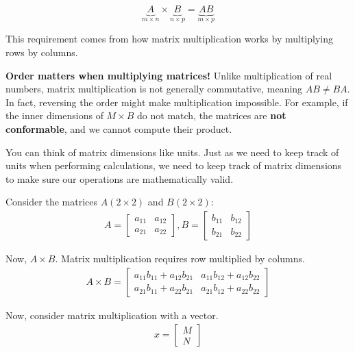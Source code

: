 \documentclass[12pt]{article}
\begin{document}
\[
\underbrace{A}_{m \times n} \times
\underbrace{B}_{n \times p}
=
\underbrace{AB}_{m \times p}
\]

This requirement comes from how matrix multiplication works by multiplying rows by columns. 

\textbf{Order matters when multiplying matrices!} Unlike multiplication of real numbers, matrix multiplication is not generally commutative, meaning $AB \neq BA$. In fact, reversing the order might make multiplication impossible. For example, if the inner dimensions of $M \times B$ do not match, the matrices are \textbf{not conformable}, and we cannot compute their product.

You can think of matrix dimensions like units. Just as we need to keep track of units when performing calculations, we need to keep track of matrix dimensions to make sure our operations are mathematically valid.

Consider the matrices $A (2 \times 2)$  and $B (2 \times 2)$:
\begin{align}
    A = \begin{bmatrix}
            a_{11} & a_{12} \\
            a_{21} & a_{22}
        \end{bmatrix}, 
    B = \begin{bmatrix}
            b_{11} & b_{12} \\
            b_{21} & b_{22}
        \end{bmatrix}
\end{align}

Now,  $A \times B$. Matrix multiplication requires row multiplied by columns.
\begin{align}
    A \times B = \begin{bmatrix}
        a_{11} b_{11} + a_{12} b_{21}  & a_{11} b_{12} + a_{12} b_{22} \\
        a_{21} b_{11} + a_{22} b_{21}  & a_{21} b_{12} + a_{22} b_{22} 
    \end{bmatrix}
\end{align}

Now, consider matrix multiplication with a vector.
\begin{align}
    x = \begin{bmatrix}
            M \\
            N
        \end{bmatrix}
\end{align}
\end{document}
